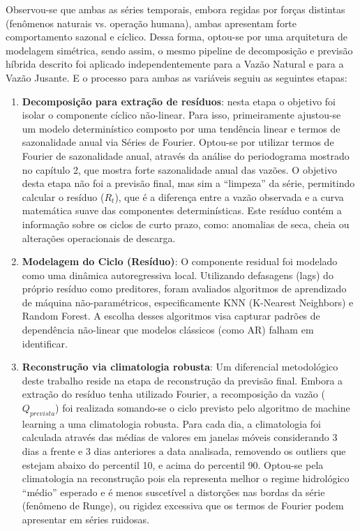 Observou-se que ambas as séries temporais, embora regidas por forças distintas (fenômenos naturais vs. operação humana), ambas apresentam forte comportamento sazonal e cíclico. Dessa forma, optou-se por uma arquitetura de modelagem simétrica, sendo assim, o mesmo pipeline de decomposição e previsão híbrida descrito foi aplicado independentemente para a Vazão Natural e para a Vazão Jusante. E o processo para ambas as variáveis seguiu as seguintes etapas:

\begin{enumerate}
\item \textbf{Decomposição para extração de resíduos}: nesta etapa o objetivo foi isolar o componente cíclico não-linear. Para isso, primeiramente ajustou-se um modelo determinístico composto por uma tendência linear e termos de sazonalidade anual via Séries de Fourier. Optou-se por utilizar termos de Fourier de sazonalidade anual, através da análise do periodograma mostrado no capítulo 2, que mostra forte sazonalidade anual das vazões. O objetivo desta etapa não foi a previsão final, mas sim a ``limpeza'' da série, permitindo calcular o resíduo ($R_t$), que é a diferença entre a vazão observada e a curva matemática suave das componentes determinísticas. Este resíduo contém a informação sobre os ciclos de curto prazo, como: anomalias de seca, cheia ou alterações operacionais de descarga.

\item \textbf{Modelagem do Ciclo (Resíduo)}: O componente residual foi modelado como uma dinâmica autoregressiva local. Utilizando defasagens (lags) do próprio resíduo como preditores, foram avaliados algoritmos de aprendizado de máquina não-paramétricos, especificamente KNN (K-Nearest Neighbors) e Random Forest. A escolha desses algoritmos visa capturar padrões de dependência não-linear que modelos clássicos (como AR) falham em identificar.

\item \textbf{Reconstrução via climatologia robusta}: Um diferencial metodológico deste trabalho reside na etapa de reconstrução da previsão final. Embora a extração do resíduo tenha utilizado Fourier, a recomposição da vazão ($Q_{prevista}$) foi realizada somando-se o ciclo previsto pelo algoritmo de machine learning a uma climatologia robusta. Para cada dia, a climatologia foi calculada através das médias de valores em janelas móveis considerando 3 dias a frente e 3 dias anteriores a data analisada, removendo os outliers que estejam abaixo do percentil 10, e acima do percentil 90. Optou-se pela climatologia na reconstrução pois ela representa melhor o regime hidrológico ``médio'' esperado e é menos suscetível a distorções nas bordas da série (fenômeno de Runge), ou rigidez excessiva que os termos de Fourier podem apresentar em séries ruidosas.
\end{enumerate}

